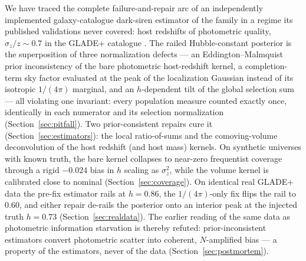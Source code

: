 
We have traced the complete failure-and-repair arc of an independently
implemented galaxy-catalogue dark-siren estimator of the
\citet{Gray:2019ksv} family in a regime its published validations never
covered: host redshifts of photometric quality, $\sigma_z/z \sim 0.7$
in the GLADE+ catalogue \citep{Dalya:2021ewn}.  The railed
Hubble-constant posterior is the superposition of three normalization
defects --- an Eddington--Malmquist prior inconsistency of the bare
photometric host-redshift kernel, a completion-term sky factor
evaluated at the peak of the localization Gaussian instead of its
isotropic $1/(4\pi)$ marginal, and an $h$-dependent tilt of the global
selection sum --- all violating one invariant: every population measure
counted exactly once, identically in each numerator and its selection
normalization (Section~\ref{sec:pitfall}).  Two prior-consistent
repairs cure it (Section~\ref{sec:estimators}): the local
ratio-of-sums and the comoving-volume deconvolution of the host
redshift (and host mass) kernels.  On synthetic universes with known
truth, the bare kernel collapses to near-zero frequentist coverage
through a rigid $-0.024$ bias in $h$ scaling as $\sigma_z^2$, while
the volume kernel is calibrated close to nominal
(Section~\ref{sec:coverage}).
On identical real GLADE+ data the pre-fix estimator rails at
$h = 0.86$, the $1/(4\pi)$-only fix flips the rail to $0.60$, and
either repair de-rails the posterior onto an interior peak at the
injected truth $h = 0.73$ (Section~\ref{sec:realdata}).
The earlier reading of the same data as photometric information
starvation is thereby refuted: prior-inconsistent estimators convert
photometric scatter into coherent, $N$-amplified bias --- a property of
the estimators, never of the data (Section~\ref{sec:postmortem}).

